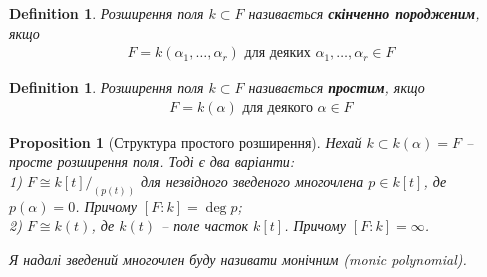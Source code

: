 \documentclass[a4paper, 10pt]{article}
\makeatletter
\theoremstyle{theoremdd}
\theoremstyle{theoremdd}
\newtheorem{definition}[theorem]{Definition}
\theoremstyle{theoremdd}
\theoremstyle{theoremdd}
\theoremstyle{theoremdd}
\theoremstyle{theoremdd}
\theoremstyle{theoremdd}
\theoremstyle{theoremdd}
\theoremstyle{theoremdd}
\newtheorem{proposition}[theorem]{Proposition}
\theoremstyle{theoremdd}
\theoremstyle{theoremdd}
\theoremstyle{theoremdd}
\theoremstyle{theoremdd}
\theoremstyle{theoremdd}
\theoremstyle{theoremdd}
\renewenvironment{proof}[1][Proof.\\]{\par
\pushQED{\hfill \qed}%
\normalfont \topsep6\p@\@plus6\p@\relax
\trivlist
\item\relax
{\bfseries
#1\@addpunct{.}}\hspace\labelsep\ignorespaces
}{%
\popQED\endtrivlist\@endpefalse
}
\makeatother
\begin{document}
\begin{definition}
Розширення поля $k \subset F$ називається \textbf{скінченно породженим}, якщо
\begin{align*}
F = k(\alpha_1,\dots,\alpha_r) \text{ для деяких } \alpha_1,\dots,\alpha_r \in F
\end{align*}
\end{definition}

\iffalse
\begin{proposition}
$k(\alpha_1,\dots,\alpha_r) = \left\{ \dfrac{f(\alpha_1,\dots,\alpha_r)}{g(\alpha_1,\dots,\alpha_r)} \Big| f,g \in k[x_1,\dots,x_r] \right\}$.
\end{proposition}

\begin{proof}
Позначимо $E = \left\{ \dfrac{f(\alpha_1,\dots,\alpha_r)}{g(\alpha_1,\dots,\alpha_r)} \Big| f,g \in k[x_1,\dots,x_r] \right\}$. Множина $E$ буде полем, як поле частко $k[x_1,\dots,x_r]$. Причому ясно, що $E$ містить все поле $k$ та $\alpha_1,\dots,\alpha_r$, тому $E \supset k(\alpha_1,\dots,\alpha_r)$.\\
Нехай $E' \supset E$ -- менше поле, що містить поле $k$ та $\alpha_1,\dots,\alpha_r$.
\end{proof}
\fi

\begin{definition}
Розширення поля $k \subset F$ називається \textbf{простим}, якщо
\begin{align*}
F = k(\alpha) \text{ для деякого } \alpha \in F
\end{align*}
\end{definition}

\begin{proposition}[Структура простого розширення]
Нехай $k \subset k(\alpha) = F$ -- просте розширення поля. Тоді є два варіанти:\\
1) $F \cong k[t]/_{(p(t))}$ для незвідного зведеного многочлена $p \in k[t]$, де $p(\alpha) = 0$. Причому $[F:k] = \deg p$;\\
2) $F \cong k(t)$, де $k(t)$ -- поле часток $k[t]$. Причому $[F:k] = \infty$.
\end{proposition}

\textit{Я надалі зведений многочлен буду називати монічним (monic polynomial).}
\end{document}
